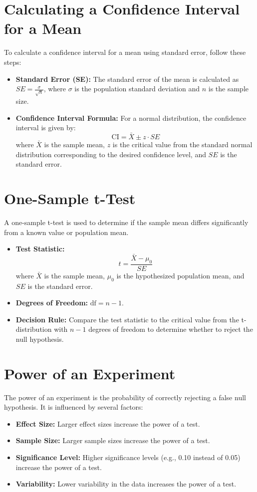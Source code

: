 \documentclass{article}
\begin{document}
\section{Calculating a Confidence Interval for a Mean}
To calculate a confidence interval for a mean using standard error, follow these steps:

\begin{itemize}
    \item \textbf{Standard Error (SE):} The standard error of the mean is calculated as \( SE = \frac{\sigma}{\sqrt{n}} \), where \(\sigma\) is the population standard deviation and \(n\) is the sample size.
    \item \textbf{Confidence Interval Formula:} For a normal distribution, the confidence interval is given by:
    \[
    \text{CI} = \bar{X} \pm z \cdot SE
    \]
    where \(\bar{X}\) is the sample mean, \(z\) is the critical value from the standard normal distribution corresponding to the desired confidence level, and \(SE\) is the standard error.
\end{itemize}

\section{One-Sample t-Test}
A one-sample t-test is used to determine if the sample mean differs significantly from a known value or population mean.

\begin{itemize}
    \item \textbf{Test Statistic:} 
    \[
    t = \frac{\bar{X} - \mu_0}{SE}
    \]
    where \(\bar{X}\) is the sample mean, \(\mu_0\) is the hypothesized population mean, and \(SE\) is the standard error.
    \item \textbf{Degrees of Freedom:} \( \text{df} = n - 1 \).
    \item \textbf{Decision Rule:} Compare the test statistic to the critical value from the t-distribution with \(n - 1\) degrees of freedom to determine whether to reject the null hypothesis.
\end{itemize}

\section{Power of an Experiment}
The power of an experiment is the probability of correctly rejecting a false null hypothesis. It is influenced by several factors:

\begin{itemize}
    \item \textbf{Effect Size:} Larger effect sizes increase the power of a test.
    \item \textbf{Sample Size:} Larger sample sizes increase the power of a test.
    \item \textbf{Significance Level:} Higher significance levels (e.g., 0.10 instead of 0.05) increase the power of a test.
    \item \textbf{Variability:} Lower variability in the data increases the power of a test.
\end{itemize}
\end{document}
